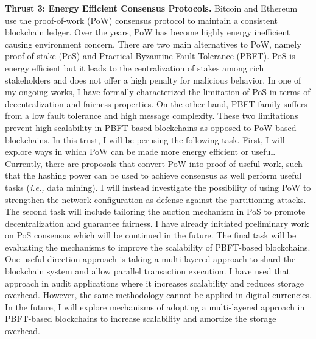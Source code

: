 \documentclass{NSF}
\newcommand{\BfPara}[1]{{\noindent\textbf{#1.}}\xspace}
\begin{document}
\BfPara{Thrust 3: Energy Efficient Consensus Protocols} Bitcoin and Ethereum use the proof-of-work (PoW) consensus protocol to maintain a consistent blockchain ledger. Over the years, PoW has become highly energy inefficient causing environment concern. There are two main alternatives to PoW, namely proof-of-stake (PoS) and Practical Byzantine Fault Tolerance (PBFT). PoS is energy efficient but it leads to the centralization of stakes among rich stakeholders and does not offer a high penalty for malicious behavior. In one of my ongoing works, I have formally characterized the limitation of PoS in terms of decentralization and fairness properties. On the other hand, PBFT family suffers from a low fault tolerance and high message complexity. These two limitations prevent high scalability in PBFT-based blockchains as opposed to PoW-based blockchains. In this trust, I will be perusing the following task. First, I will explore ways in which PoW can be made more energy efficient or useful. Currently, there are proposals that convert PoW into proof-of-useful-work, such that the hashing power can be used to achieve consensus as well perform useful tasks ({\em i.e.,} data mining). I will instead investigate the possibility of using PoW to strengthen the network configuration as defense against the partitioning attacks. The second task will include tailoring the auction mechanism in PoS to promote decentralization and guarantee fairness. I have already initiated preliminary work on PoS consensus which will be continued in the future. The final task will be evaluating the mechanisms to improve the scalability of PBFT-based blockchains. One useful direction approach is taking a multi-layered approach to shard the blockchain system and allow parallel transaction execution. I have used that approach in audit applications where it increases scalability and reduces storage overhead. However, the same methodology cannot be applied in digital currencies.  In the future, I will explore mechanisms of adopting a multi-layered approach in PBFT-based blockchains to increase scalability and amortize the storage overhead. 
\end{document}
